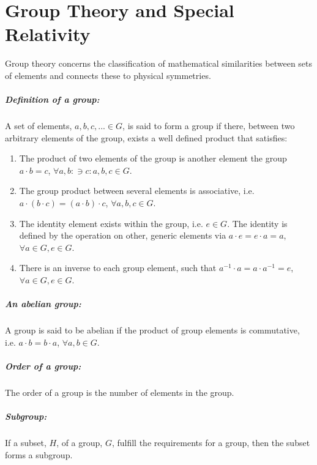 \chapter{Group Theory and Special Relativity}
\label{chp:group theory}
Group theory concerns the classification of mathematical similarities between sets of elements and connects these to physical symmetries. 
\paragraph{Definition of a group: }
A set of elements, $a,b,c,...\in G$, is said to form a group if there, between two arbitrary elements of the group, exists a well defined product that satisfies:
\begin{enumerate}
	\item The product of two elements of the group is another element the group $a\cdot b=c$, $\forall a,b:\ni c:a,b,c\in G$.
	\item The group product between several elements is associative, i.e. $a\cdot(b\cdot c)=(a\cdot b)\cdot c$, $\forall a,b,c\in G$.
	\item The identity element exists within the group, i.e. $e\in G$. The identity is defined by the operation on other, generic elements via $a\cdot e=e\cdot a=a$, $\forall a\in G, e\in G$.
	\item There is an inverse to each group element, such that $a^{-1}\cdot a=a\cdot a^{-1}=e$, $\forall a\in G, e\in G$.
\end{enumerate}
\paragraph{An abelian group: }
A group is said to be abelian if the product of group elements is commutative, i.e. $a\cdot b=b\cdot a$, $\forall a,b\in G$.
\paragraph{Order of a group: }
The order of a group is the number of elements in the group.
\paragraph{Subgroup: }
If a subset, $H$, of a group, $G$, fulfill the requirements for a group, then the subset forms a subgroup.
